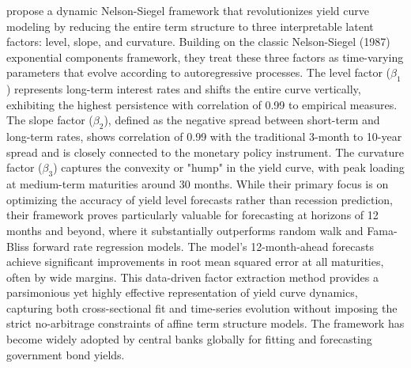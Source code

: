 \citet{diebold2006forecasting} propose a dynamic Nelson-Siegel framework that revolutionizes yield curve modeling by reducing the entire term structure to three interpretable latent factors: level, slope, and curvature. Building on the classic Nelson-Siegel (1987) exponential components framework, they treat these three factors as time-varying parameters that evolve according to autoregressive processes. The level factor ($\beta_1$) represents long-term interest rates and shifts the entire curve vertically, exhibiting the highest persistence with correlation of 0.99 to empirical measures. The slope factor ($\beta_2$), defined as the negative spread between short-term and long-term rates, shows correlation of 0.99 with the traditional 3-month to 10-year spread and is closely connected to the monetary policy instrument. The curvature factor ($\beta_3$) captures the convexity or "hump" in the yield curve, with peak loading at medium-term maturities around 30 months. While their primary focus is on optimizing the accuracy of yield level forecasts rather than recession prediction, their framework proves particularly valuable for forecasting at horizons of 12 months and beyond, where it substantially outperforms random walk and Fama-Bliss forward rate regression models. The model's 12-month-ahead forecasts achieve significant improvements in root mean squared error at all maturities, often by wide margins. This data-driven factor extraction method provides a parsimonious yet highly effective representation of yield curve dynamics, capturing both cross-sectional fit and time-series evolution without imposing the strict no-arbitrage constraints of affine term structure models. The framework has become widely adopted by central banks globally for fitting and forecasting government bond yields.

